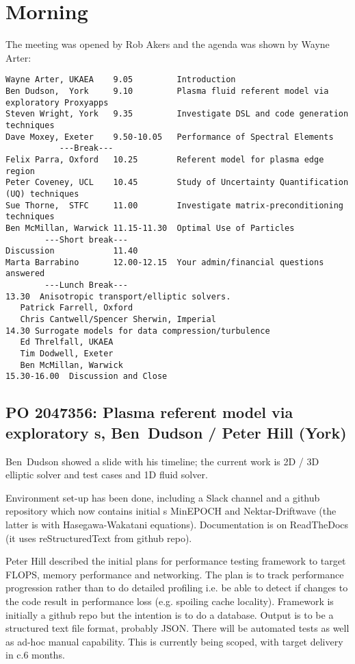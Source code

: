 \section{Morning}

The meeting was opened by Rob Akers and the agenda was shown by Wayne Arter:

\begin{verbatim}
Wayne Arter, UKAEA    9.05         Introduction
Ben Dudson,  York     9.10         Plasma fluid referent model via exploratory Proxyapps
Steven Wright, York   9.35         Investigate DSL and code generation techniques
Dave Moxey, Exeter    9.50-10.05   Performance of Spectral Elements
           ---Break---
Felix Parra, Oxford   10.25        Referent model for plasma edge region
Peter Coveney, UCL    10.45        Study of Uncertainty Quantification (UQ) techniques
Sue Thorne,  STFC     11.00        Investigate matrix-preconditioning techniques
Ben McMillan, Warwick 11.15-11.30  Optimal Use of Particles
        ---Short break---
Discussion            11.40
Marta Barrabino       12.00-12.15  Your admin/financial questions answered
        ---Lunch Break---
13.30  Anisotropic transport/elliptic solvers. 
   Patrick Farrell, Oxford
   Chris Cantwell/Spencer Sherwin, Imperial
14.30 Surrogate models for data compression/turbulence 
   Ed Threlfall, UKAEA
   Tim Dodwell, Exeter
   Ben McMillan, Warwick 
15.30-16.00  Discussion and Close
\end{verbatim}

\subsection{PO 2047356: Plasma referent model via exploratory \papp s, Ben~Dudson / Peter Hill (York)}

Ben~Dudson showed a slide with his timeline; the current work is 2D / 3D 
elliptic solver and test cases and 1D fluid solver.

Environment set-up has been done, including a Slack channel and a github 
repository which now contains initial \papp s MinEPOCH and Nektar-Driftwave 
(the latter is  with Hasegawa-Wakatani equations).  Documentation 
is on ReadTheDocs (it uses reStructuredText from github repo).

Peter Hill described the initial plans for performance testing framework to 
target FLOPS, memory performance and networking.  The plan is to track 
performance progression rather than to do detailed profiling i.e. be able to 
detect if changes to the code result in performance loss (e.g. spoiling cache 
locality).  Framework is initially a github repo but the intention is to do a 
database.  Output is to be a structured text file format, probably JSON.  There will be 
automated tests as well as ad-hoc manual capability.  This is currently being 
scoped, with target delivery in c.6 months.

